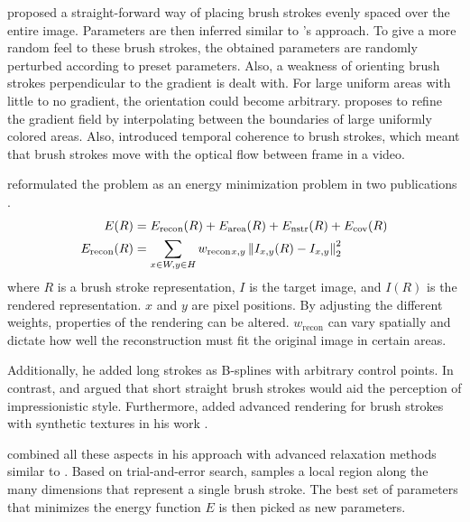 \citeauthor*{apple} proposed a straight-forward way of placing brush strokes evenly spaced over the entire image.
Parameters are then inferred similar to \citeauthor*{paintbynumbers}'s approach.
To give a more random feel to these brush strokes, the obtained parameters are randomly perturbed according to preset parameters.
Also, a weakness of orienting brush strokes perpendicular to the gradient is dealt with.
For large uniform areas with little to no gradient, the orientation could become arbitrary.
\citeauthor*{apple} proposes to refine the gradient field by interpolating between the boundaries of large uniformly colored areas.
Also, \citeauthor*{apple} introduced temporal coherence to brush strokes, which meant that brush strokes move with the optical flow between frame in a video.

\citeauthor*{hertzmann} reformulated the problem as an energy minimization problem in two publications \cite{hertzmanreview, Hertzmann}.
\begin{align}
    E(R) & = E_{\text{recon}}(R) + E_{\text{area}}(R) + E_{\text{nstr}}(R) + E_{\text{cov}}(R) \\
    E_{\text{recon}}(R) & = \sum_{x \in W, y \in H} w_{\text{recon}}{}_{x, y} \left\lVert I_{x, y}(R) - I_{x, y}\right\rVert^2_2 \\
\end{align}
where $R$ is a brush stroke representation, $I$ is the target image, and $I(R)$ is the rendered representation.
$x$ and $y$ are pixel positions.
By adjusting the different weights, properties of the rendering can be altered.
$w_{\text{recon}}$ can vary spatially and dictate how well the reconstruction must fit the original image in certain areas.

Additionally, he added long strokes as B-splines with arbitrary control points.
In contrast, \citeauthor*{paintbynumbers} and \citeauthor*{apple} argued that short straight brush strokes would aid the perception of impressionistic style.
Furthermore, \citeauthor*{Hertzmann} added advanced rendering for brush strokes with synthetic textures in his work \cite{Hertzmann}.

\citeauthor*{Hertzmann} combined all these aspects in his approach with advanced relaxation methods similar to \citeauthor*{paintbynumbers}.
Based on trial-and-error search, \citeauthor*{Hertzmann} samples a local region along the many dimensions that represent a single brush stroke.
The best set of parameters that minimizes the energy function $E$ is then picked as new parameters.

